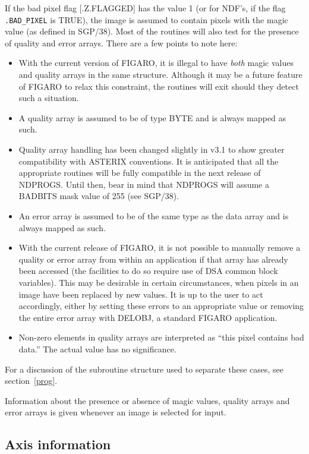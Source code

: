 If the bad pixel flag [.Z.FLAGGED] has the value 1 (or for NDF's, if the flag
{\tt .BAD\_PIXEL} is TRUE),
the image is assumed to 
contain pixels with the magic value (as defined in SGP/38). Most of the
routines will also test for the presence of quality and error arrays. There
are a few points to note here:
\begin{itemize}
\item With the current version of FIGARO, it is illegal to have {\em both}
magic values and quality arrays in the same structure. Although it may be
a future feature of FIGARO to relax this constraint, the routines will exit
should they detect such a situation.
\item A quality array is assumed to be of type BYTE and is always mapped as
such. 
\item Quality array handling has been changed slightly in v3.1 to show greater
compatibility with ASTERIX conventions. It is anticipated that all the
appropriate routines will be fully compatible in the next release of NDPROGS.
Until then, bear in mind that NDPROGS will assume a BADBITS mask value of 255
(see SGP/38). 
\item An error array is assumed to be of the same type as the data array and is
always mapped as such.
\item With the current release of FIGARO, it is not possible to manually
remove a quality or error array from within an application if that array
has already been accessed (the facilities to do so require use of DSA
common block variables). This may be desirable in certain circumstances,
when pixels in an image have been replaced by new values. 
It is up to the user to act accordingly, either by setting these errors
to an appropriate value
or removing the entire error array with DELOBJ, a standard FIGARO application.
\item Non-zero elements in quality arrays are interpreted as 
``this pixel contains bad data.'' The actual value has no significance.
\end{itemize}
For a discussion of the
subroutine structure used to separate these cases, see section~\ref{prog}.

Information about the presence or absence of magic values, quality arrays and
error arrays is given whenever an image is selected for input. 
                                                                       
\subsection{Axis information}

